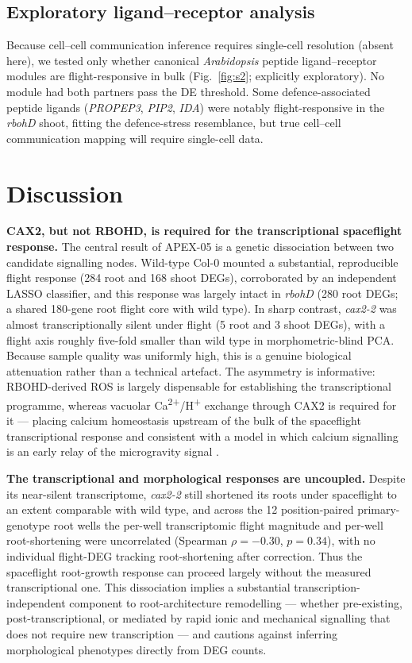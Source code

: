 \documentclass[pdflatex,sn-nature]{sn-jnl}
\begin{document}
\subsection{Exploratory ligand--receptor analysis}
Because cell--cell communication inference requires single-cell resolution (absent
here), we tested only whether canonical \textit{Arabidopsis} peptide ligand--receptor
modules are flight-responsive in bulk (Fig.~\ref{fig:s2}; explicitly exploratory). No
module had both partners pass the DE threshold. Some defence-associated peptide
ligands (\textit{PROPEP3}, \textit{PIP2}, \textit{IDA}) were notably flight-responsive
in the \textit{rbohD} shoot, fitting the defence-stress resemblance, but true
cell--cell communication mapping will require single-cell data.

\section{Discussion}\label{sec:discussion}

\textbf{CAX2, but not RBOHD, is required for the transcriptional spaceflight
response.} The central result of APEX-05 is a genetic dissociation between two
candidate signalling nodes. Wild-type Col-0 mounted a substantial, reproducible flight
response (284 root and 168 shoot DEGs), corroborated by an independent LASSO
classifier, and this response was largely intact in \textit{rbohD} (280 root DEGs; a
shared 180-gene root flight core with wild type). In sharp contrast, \textit{cax2-2}
was almost transcriptionally silent under flight (5 root and 3 shoot DEGs), with a
flight axis roughly five-fold smaller than wild type in morphometric-blind PCA. Because
sample quality was uniformly high, this is a genuine biological attenuation rather than
a technical artefact. The asymmetry is informative: RBOHD-derived ROS is largely
dispensable for establishing the transcriptional programme, whereas vacuolar
Ca\textsuperscript{2+}/H\textsuperscript{+} exchange through CAX2 is required for it ---
placing calcium homeostasis upstream of the bulk of the spaceflight transcriptional
response and consistent with a model in which calcium signalling is an early relay of
the microgravity signal \cite{shigaki2003,pittman2005}.

\textbf{The transcriptional and morphological responses are uncoupled.} Despite its
near-silent transcriptome, \textit{cax2-2} still shortened its roots under spaceflight
to an extent comparable with wild type, and across the 12 position-paired
primary-genotype root wells the per-well transcriptomic flight magnitude and per-well
root-shortening were uncorrelated (Spearman \(\rho = -0.30\), \(p = 0.34\)), with no
individual flight-DEG tracking root-shortening after correction. Thus the spaceflight
root-growth response can proceed largely without the measured transcriptional one. This
dissociation implies a substantial transcription-independent component to
root-architecture remodelling --- whether pre-existing, post-transcriptional, or
mediated by rapid ionic and mechanical signalling that does not require new
transcription --- and cautions against inferring morphological phenotypes directly from
DEG counts.
\end{document}
